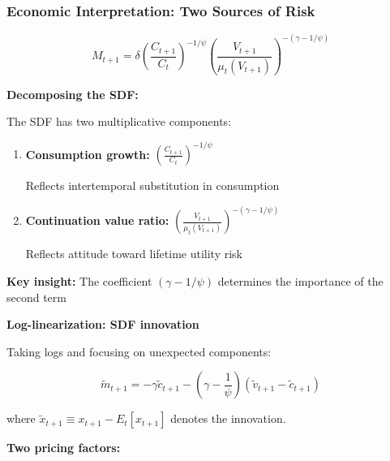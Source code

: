 \documentclass{beamer}
\begin{document}
\begin{frame}[allowframebreaks]
    \frametitle{Economic Interpretation: Two Sources of Risk}

        
    \begin{tcolorbox}[colback=blue!5!white, colframe=blue!75!black, title=Epstein-Zin SDF (Final Form)]
    \begin{equation*}
        M_{t+1} = \delta \left( \frac{C_{t+1}}{C_t} \right)^{-1/\psi} \left( \frac{V_{t+1}}{\mu_t(V_{t+1})} \right)^{-(\gamma - 1/\psi)}
    \end{equation*}
    \end{tcolorbox}
    
    \textbf{Decomposing the SDF:}
    
    The SDF has two multiplicative components:
    \begin{enumerate}
        \item \textbf{Consumption growth:} $\left( \frac{C_{t+1}}{C_t} \right)^{-1/\psi}$
        
        Reflects intertemporal substitution in consumption
        
        \item \textbf{Continuation value ratio:} $\left( \frac{V_{t+1}}{\mu_t(V_{t+1})} \right)^{-(\gamma-1/\psi)}$
        
        Reflects attitude toward lifetime utility risk
    \end{enumerate}
    
    \textbf{Key insight:} The coefficient $(\gamma - 1/\psi)$ determines the importance of the second term
    
    \framebreak

    \textbf{Log-linearization: SDF innovation}
    
    Taking logs and focusing on unexpected components:
    \begin{tcolorbox}[colback=green!5!white, colframe=green!75!black, title=SDF Innovation]
    \begin{equation*}
        \tilde{m}_{t+1} = -\gamma \tilde{c}_{t+1} - \left( \gamma - \frac{1}{\psi} \right) (\tilde{v}_{t+1} - \tilde{c}_{t+1})
    \end{equation*}
    \end{tcolorbox}
    
    where $\tilde{x}_{t+1} \equiv x_{t+1} - E_t[x_{t+1}]$ denotes the innovation.
    
    \framebreak
    
    \textbf{Two pricing factors:}
    

\end{frame}
\end{document}
